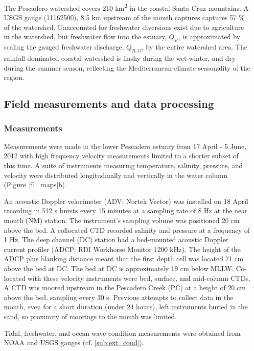 The Pescadero watershed covers 210 km\textsuperscript{2} in the coastal
Santa Cruz mountains. A USGS gauge (11162500), 8.5 km upstream of
the mouth captures captures 57 \% of the watershed. Unaccounted for
freshwater diversions exist due to agriculture in the watershed, but
freshwater flow into the estuary, \emph{$Q_{R}$, }is approximated
by scaling the gauged freshwater discharge, $Q_{R,G}$, by the entire
watershed area. The rainfall dominated coastal watershed is flashy during the wet winter, and dry during the summer season, reflecting the Mediterranean-climate seasonality of the region.


\subsection{Field measurements and data processing}


\subsubsection{Measurements}

Measurements were made in the lower Pescadero estuary from 17 April
- 5 June, 2012 with high frequency velocity measurements limited to
a shorter subset of this time. A suite of instruments measuring temperature,
salinity, pressure, and velocity were distributed longitudinally and
vertically in the water column (Figure \ref{f1_maps}b).

An acoustic Doppler velocimeter (ADV; Nortek Vector) was installed
on 18 April recording in 512 s bursts every 15 minutes at a sampling
rate of 8 Hz at the near mouth (NM) station. The instrument's sampling
volume was positioned 20 cm above the bed. A collocated CTD recorded
salinity and pressure at a frequency of 1 Hz. The deep channel (DC)
station had a bed-mounted acoustic Doppler current profiler (ADCP;
RDI Workhorse Monitor 1200 kHz). The height of the ADCP plus blanking
distance meant that the first depth cell was located 71 cm above
the bed at DC. The bed at DC is approximately 19 cm below MLLW. Co-located
with these velocity instruments were bed, surface, and mid-column
CTDs. A CTD was moored upstream in the Pescadero Creek (PC) at a height of 20 cm above the bed, sampling every 30 s. Previous attempts to collect data in the mouth, even for a short duration (under 24 hours), left instruments
buried in the sand, so proximity of moorings to the mouth was limited. 

Tidal, freshwater, and ocean wave condition measurements were obtained
from NOAA and USGS gauges (cf. \ref{sub:ext_cond}).




